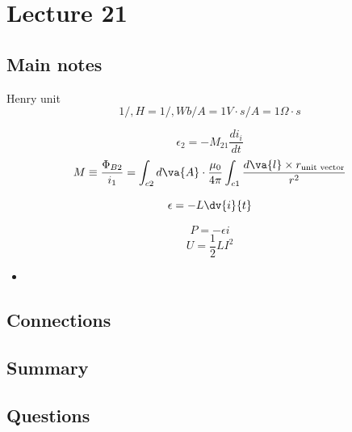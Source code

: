 \section{Lecture 21}
\subsection{Main notes}
Henry unit
\[
1 /, H = 1 /, Wb/A = 1V \cdot s/A = 1 \Omega \cdot s
  \]

\[
\epsilon_2 = - M_{21} \frac{di_i}{dt}
  \]
\[
M \equiv \frac{\Phi_{B2}}{i_1} = \int_{c2}d\va{A} \cdot \frac{\mu_0}{4 \pi} \int_{c1} \frac{d \va{l} \times r_{\text{unit vector}}}{r^2}
  \]

\[
\epsilon = -L \dv{i}{t}
  \]

\[
    P = - \epsilon i
  \]
\[
U = \frac{1}{2}LI^2
  \]


\begin{itemize}
	\item
\end{itemize}


\subsection{Connections}


\subsection{Summary}


\subsection{Questions}
